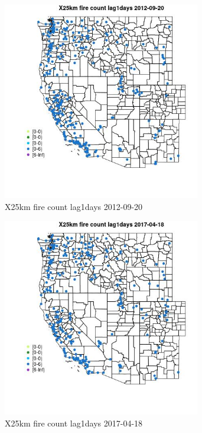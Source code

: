 \begin{figure} 
\centering  
\includegraphics[width=0.77\textwidth]{Code_Outputs/Report_ML_input_PM25_Step4_part_e_de_duplicated_aves_compiled_2019-05-14wNAs_MapObsX25km_fire_count_lag1days2012-09-20.jpg} 
\caption{\label{fig:Report_ML_input_PM25_Step4_part_e_de_duplicated_aves_compiled_2019-05-14wNAsMapObsX25km_fire_count_lag1days2012-09-20}X25km fire count lag1days 2012-09-20} 
\end{figure} 
 

\clearpage 

\begin{figure} 
\centering  
\includegraphics[width=0.77\textwidth]{Code_Outputs/Report_ML_input_PM25_Step4_part_e_de_duplicated_aves_compiled_2019-05-14wNAs_MapObsX25km_fire_count_lag1days2017-04-18.jpg} 
\caption{\label{fig:Report_ML_input_PM25_Step4_part_e_de_duplicated_aves_compiled_2019-05-14wNAsMapObsX25km_fire_count_lag1days2017-04-18}X25km fire count lag1days 2017-04-18} 
\end{figure} 
 

